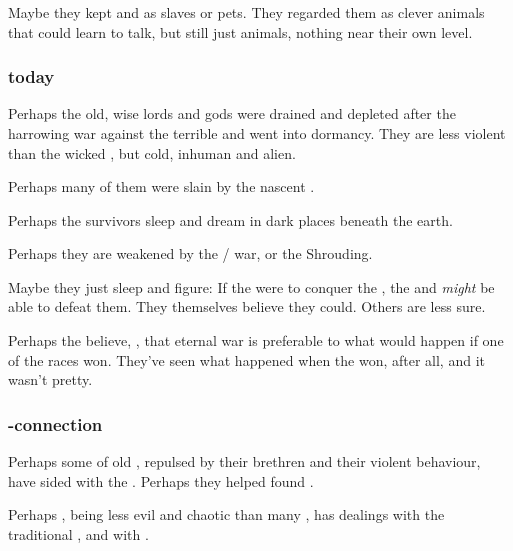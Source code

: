 \subsubsection{\Nephilim}
Maybe they kept \nephilim{} and \meccara{} as slaves or pets. 
They regarded them as clever animals that could learn to talk, but still just animals, nothing near their own level. 





\subsubsection{\Ophidians today}
Perhaps the old, wise \ophidian{} lords and gods were drained and depleted after the harrowing war against the terrible \xzaishanns{} and went into dormancy. 
They are less violent than the wicked \draecchonosh, but cold, inhuman and alien. 

Perhaps many of them were slain by the nascent \draecchonosh. 

Perhaps the survivors sleep and dream in dark places beneath the earth. 

Perhaps they are weakened by the \dragon/\bane{} war, or the Shrouding. 

Maybe they just sleep and figure: 
If the \banes{} were to conquer the \dragons, the \ophidians{} and \nagae{} \emph{might} be able to defeat them. 
They themselves believe they could. 
Others are less sure. 

Perhaps the \ophidians{} believe, , that eternal war is preferable to what would happen if one of the races won. 
They've seen what happened when the \draecchonosh{} won, after all, and it wasn't pretty.





\subsubsection{\Ophidian-\resphan connection}
Perhaps some of old \ophidians, repulsed by their \draconic{} brethren and their violent behaviour, have sided with the \resphain. Perhaps they helped found \Mystraacht. 

Perhaps \Ishnaruchaefir, being less evil and chaotic than many \dragons, has dealings with the traditional \ophidians{}, and with \Mystraacht.  





